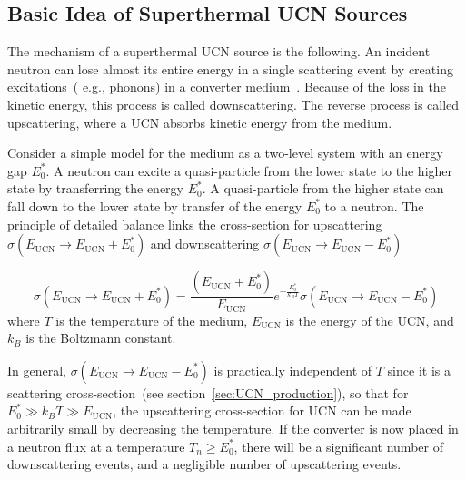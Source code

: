 
 
\subsection{Basic Idea of Superthermal UCN Sources\label{sec:basic_idea}}
The mechanism of a superthermal UCN source is the following.  An
incident neutron can lose almost its entire energy in a single
scattering event by creating excitations~( e.g., phonons) in a
converter medium~\cite{ucnbook, Golub75}. Because of the loss in the
kinetic energy, this process is called downscattering. The reverse
process is called upscattering, where a UCN absorbs kinetic energy from
the medium.


Consider a simple model for the medium as a two-level system with an
energy gap $E_0^*$. A neutron can excite a quasi-particle from the
lower state to the higher state by transferring the energy $E_0^*$. A
quasi-particle from the higher state can fall down to the lower state
by transfer of the energy $E_0^*$ to a neutron.  The principle of
detailed balance links the cross-section for upscattering
$\sigma(E_{\text{UCN}} \rightarrow E_{\text{UCN}}+E_0^*)$ and
downscattering
$\sigma(E_{\text{UCN}} \rightarrow
E_{\text{UCN}}-E_0^*) $~\cite{ucnbook}

\begin{equation}
\label{eqn:detailed_balance}
\sigma(E_{\text{UCN}} \rightarrow E_{\text{UCN}}+E_0^*)= \frac{(E_{\text{UCN}}+E_0^*)}{E_{\text{UCN}}}
e^{-\frac{E_0^*}{k_B T}}\sigma(E_{\text{UCN}} \rightarrow E_{\text{UCN}} -E_0^*)
\end{equation}
where $T$ is the temperature of the medium, $E_{\text{UCN}}$ is the
energy of the UCN, and $k_B$ is the Boltzmann constant.

In general, $\sigma(E_{\text{UCN}} \rightarrow E_{\text{UCN}}-E_0^*)$
is practically independent of $T$ since it is a scattering
cross-section~(see section~\ref{sec:UCN_production}), so that for
$E_0^* \gg k_B T \gg E_{\text{UCN}}$, the upscattering cross-section
for UCN can be made arbitrarily small by decreasing the
temperature. If the converter is now placed in a neutron flux at a
temperature $T_n \geq E_0^*$, there will be a significant number of
downscattering events, and a negligible number of upscattering events.

